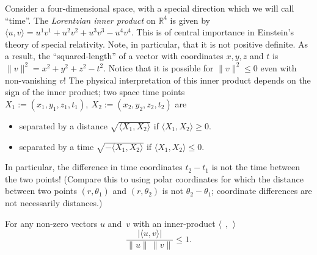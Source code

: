 
\begin{example}\label{lorentzex}
Consider a four-dimensional space, with a special direction which we will call ``time''.  The \hypertarget{lorentzian_metric}{\emph{Lorentzian inner product}} on $\mathbb{R}^4$ is given by $\langle u,v \rangle = u^1v^1 + u^2v^2 + u^3v^3 - u^4v^4$.  This is of central importance in Einstein's theory of special relativity. Note, in particular,  that it is not positive definite.
As a result, the ``squared-length'' of a vector with coordinates $x, y, z$ and $t$ is $\|v\|^2 = x^2 + y^2 + z^2 - t^2$.  Notice that it is possible for $\|v\|^2\leq 0$ even with non-vanishing $v$!  
The physical interpretation of this inner product depends on the sign of the inner product; two space time points $X_1:=(x_1,y_1,z_1,t_1),~X_2:=(x_2,y_2,z_2,t_2)$  are 
\begin{itemize}
\item separated by a distance $\sqrt{ \langle X_1, X_2\rangle }$  if $\langle X_1, X_2\rangle \geq 0$.\\
\item separated by a time $\sqrt{ -\langle X_1, X_2\rangle }$  if $\langle X_1, X_2\rangle \leq 0.$
\end{itemize}
In particular, the difference in time coordinates $t_2-t_1$ is not the time between the two points! (Compare this to using polar coordinates for which the distance between two points $(r,\theta_1)$ and $(r,\theta_2)$ is not $\theta_2-\theta_1$; coordinate differences are not necessarily distances.)
\end{example}



\begin{theorem}
For any non-zero vectors $u$ and~$v$ with an inner-product $\langle\:\  ,\:\,  \rangle$
\[ 
\frac{|\langle u,v \rangle|}{\|u\|\, \|v\|} \leq 1.
\]
\end{theorem}

